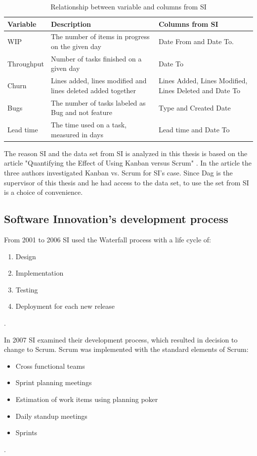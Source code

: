 \documentclass[UKenglish]{ifimaster}  %
\begin{document}
\begin{table}[!htbp]
\begin{center}
    \begin{tabular}{| l | p{5cm} |  p{5cm} |}
    \hline
    Variable &	Description	 & Columns from SI\\ \hline 
     WIP & \parbox[t]{5cm}{The number of items in progress on the given day} & Date From and Date To. \\ \hline
     Throughput	& Number of tasks finished on a given day & Date To \\ \hline
     Churn & Lines added, lines modified and lines deleted added together & Lines Added, Lines Modified, Lines Deleted and Date To \\ \hline
    Bugs & The number of tasks labeled as Bug and not feature & Type and Created Date \\ \hline
    Lead time & The time used on a task, measured in days & Lead time and Date To \\ \hline
  \end{tabular}
\caption{Relationship between variable and columns from SI}
\label{des} %
\end{center}
\end{table}
\newpage
The reason SI and the data set from SI is analyzed in this thesis is based on the article "Quantifying the Effect of Using Kanban versus Scrum" \parencite{Dag}. In the article the three authors investigated Kanban vs. Scrum for SI's case. Since Dag is the supervisor of this thesis and he had access to the data set, to use the set from SI is a choice of convenience. 






\subsection{Software Innovation's development process}
From 2001 to 2006 SI used the Waterfall process with a life cycle of:
\begin{enumerate}[noitemsep,topsep=0pt,parsep=0pt,partopsep=0pt]
\item Design
\item Implementation 
\item Testing
\item Deployment for each new release
\end{enumerate} 
\parencite{Dag}. 

In 2007 SI examined their development process, which resulted in decision to change to Scrum. Scrum was implemented with the standard elements of Scrum:
\begin{itemize}[noitemsep,topsep=0pt,parsep=0pt,partopsep=0pt]
\item Cross functional teams
\item Sprint planning meetings 
\item Estimation of work items using planning poker
\item Daily standup meetings
\item Sprints
\end{itemize}
\parencite{Dag}. 
\end{document}
